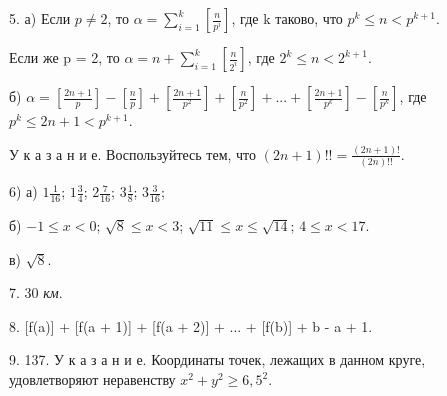 \documentclass[kvant.tex]{subfiles}
\begin{document}
5. а) Если \(p \neq 2\), то \(\displaystyle \alpha = \sum_{i=1}^{k} \left[ \frac{n}{p^i} \right]\), где k таково, что \(p^k\leq n < p^{k+1}\).\par
Если же p = 2, то \(\displaystyle \alpha = n + \sum_{i=1}^{k} \left[ \frac{n}{2^i} \right] \), где \(2^k \leq n < 2^{k+1}\).\par
б) \(\alpha = \left[ \frac{2n+1}{p} \right] - \left[ \frac{n}{p} \right] + \left[\frac{2n+1}{p^2} \right] + \left[\frac{n}{p^2} \right] + ... + \left[\frac{2n+1}{p^k} \right] - \left[\frac{n}{p^k} \right]\), где \(p^k \leq 2n+1 < p^{k+1}\).\par
{У к а з а н и е}. Воспользуйтесь тем, что \((2n+1)!! = \frac{(2n+1)!}{(2n)!!}\).\par
6) а) \(1\frac{1}{16}\); \(1\frac{3}{4}\); \(2\frac{7}{16}\); \(3\frac{1}{8}\); \(3\frac{3}{16}\);\par
б) \(-1 \leq x < 0\); \(\sqrt{8} \leq x < 3\); \(\sqrt{11} \leq x \leq \sqrt{14}\); \(4 \leq x < 17\).\par
в) \(\sqrt{8} \).\par
7. 30 \emph{км}.\par
8. [f(a)] + [f(a + 1)] + [f(a + 2)] + ... + [f(b)] + b - a + 1.\par
9. 137. У к а з а н и е. Координаты точек, лежащих в данном круге, удовлетворяют неравенству \(x^2+y^2 \geq 6,5^2\).
\end{document}
